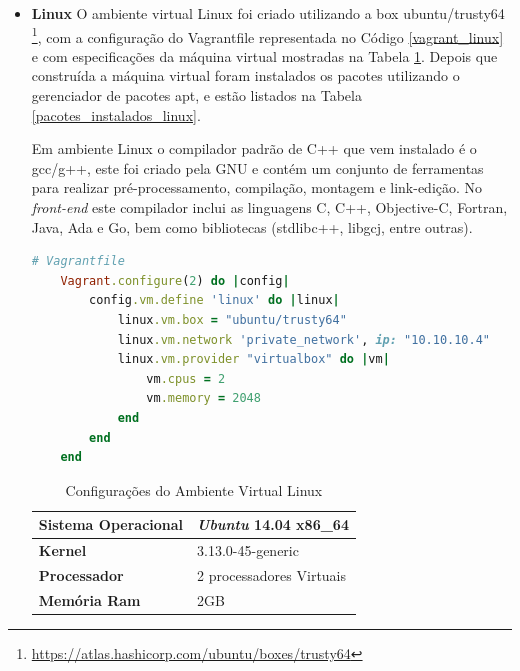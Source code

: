\begin{itemize}

    \item \textbf{Linux}
        \subitem  O ambiente virtual Linux foi criado utilizando a box
 ubuntu/trusty64 \footnote{\url{https://atlas.hashicorp.com/ubuntu/boxes/trusty64}},
 com a configuração do Vagrantfile representada no Código \ref{vagrant_linux} e com especificações
 da máquina virtual mostradas na Tabela \ref{especificacoes_linux}.
 Depois que construída a máquina virtual foram instalados os pacotes utilizando o
 gerenciador de pacotes apt, e estão listados na Tabela \ref{pacotes_instalados_linux}.

Em ambiente Linux o compilador padrão de C++ que vem instalado é o gcc/g++, este foi
 criado pela GNU e contém um conjunto de ferramentas para realizar pré-processamento,
 compilação, montagem e link-edição. No \textit{front-end} este compilador inclui as linguagens C,
 C++, Objective-C, Fortran, Java, Ada e Go, bem como bibliotecas (stdlibc++, libgcj, entre outras).


\begin{lstlisting}[language=ruby, caption={Vagrantfile com configurações da máquina virtual linux},
                  label=vagrant_linux]
    # Vagrantfile
    Vagrant.configure(2) do |config|
        config.vm.define 'linux' do |linux|
            linux.vm.box = "ubuntu/trusty64"
            linux.vm.network 'private_network', ip: "10.10.10.4"
            linux.vm.provider "virtualbox" do |vm| 
                vm.cpus = 2
                vm.memory = 2048
            end
        end              
    end
\end{lstlisting}

\begin{table}[h]
\centering
\caption{Configurações do Ambiente Virtual Linux}
\label{especificacoes_linux}
\begin{tabular}{ll}
\textbf{Sistema Operacional} & \textit{Ubuntu} 14.04 x86\_64 \\ \toprule
\textbf{Kernel} & 3.13.0-45-generic  \\ \midrule 
\textbf{Processador} & 2 processadores Virtuais \\ \midrule
\textbf{Memória Ram} & 2GB  \\ \bottomrule 
\end{tabular} 
\end{table}


\end{itemize}

